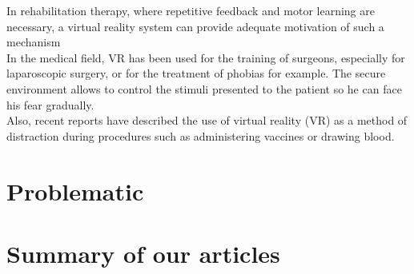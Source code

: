 \documentclass{article}
\begin{document}
In rehabilitation therapy, where repetitive feedback and motor learning are necessary, a virtual reality system can provide adequate motivation of such a mechanism \\
In the medical field, VR has been used for the training of surgeons, especially for laparoscopic surgery, or for the treatment of phobias for example. The secure environment allows to control the stimuli presented to the patient so he can face his fear gradually. \\
Also, recent reports have described the use of virtual reality (VR) as a method of distraction during
procedures such as administering vaccines or drawing blood. \\


\section{Problematic}


\section{Summary of our articles}
\end{document}
